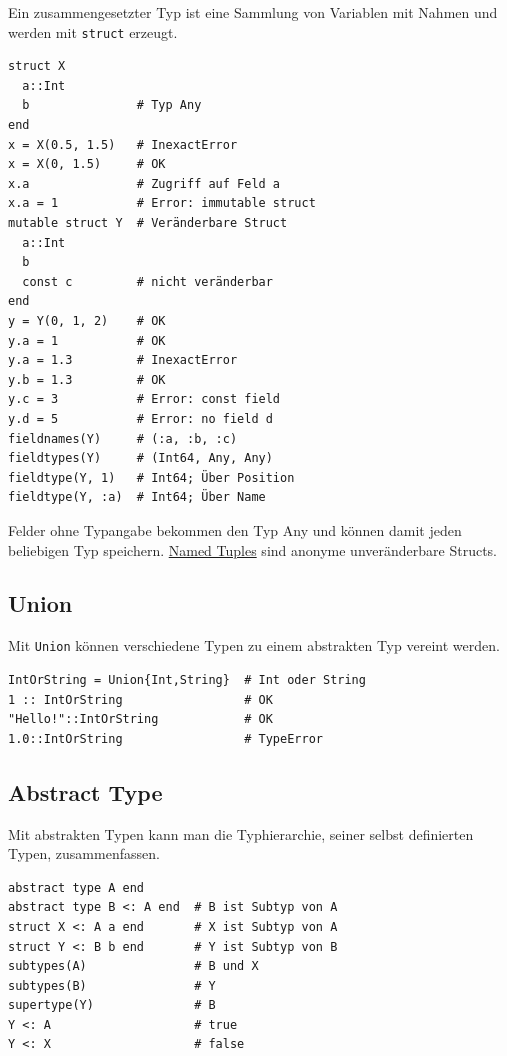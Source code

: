 \documentclass[10pt,twocolumn]{scrartcl}
\begin{document}
Ein zusammengesetzter Typ ist eine Sammlung von Variablen mit Nahmen und werden
mit \lstinline|struct| erzeugt.

\begin{lstlisting}
struct X
  a::Int
  b               # Typ Any
end
x = X(0.5, 1.5)   # InexactError
x = X(0, 1.5)     # OK
x.a               # Zugriff auf Feld a
x.a = 1           # Error: immutable struct
mutable struct Y  # Veränderbare Struct
  a::Int
  b
  const c         # nicht veränderbar
end
y = Y(0, 1, 2)    # OK
y.a = 1           # OK
y.a = 1.3         # InexactError
y.b = 1.3         # OK
y.c = 3           # Error: const field
y.d = 5           # Error: no field d
fieldnames(Y)     # (:a, :b, :c)
fieldtypes(Y)     # (Int64, Any, Any)
fieldtype(Y, 1)   # Int64; Über Position
fieldtype(Y, :a)  # Int64; Über Name
\end{lstlisting}

Felder ohne Typangabe bekommen den Typ Any und können damit jeden beliebigen Typ
speichern. \hyperref[ssec:tuple]{Named Tuples} sind anonyme unveränderbare
Structs.

\subsection{Union}
\label{ssec:union}

Mit \lstinline|Union| können verschiedene Typen zu einem abstrakten Typ vereint
werden.

\begin{lstlisting}
IntOrString = Union{Int,String}  # Int oder String
1 :: IntOrString                 # OK
"Hello!"::IntOrString            # OK
1.0::IntOrString                 # TypeError
\end{lstlisting}

\subsection{Abstract Type}
\label{ssec:AbstractType}

Mit abstrakten Typen kann man die Typhierarchie, seiner selbst definierten
Typen, zusammenfassen.

\begin{lstlisting}
abstract type A end
abstract type B <: A end  # B ist Subtyp von A
struct X <: A a end       # X ist Subtyp von A
struct Y <: B b end       # Y ist Subtyp von B
subtypes(A)               # B und X
subtypes(B)               # Y
supertype(Y)              # B
Y <: A                    # true
Y <: X                    # false
\end{lstlisting}
\end{document}
